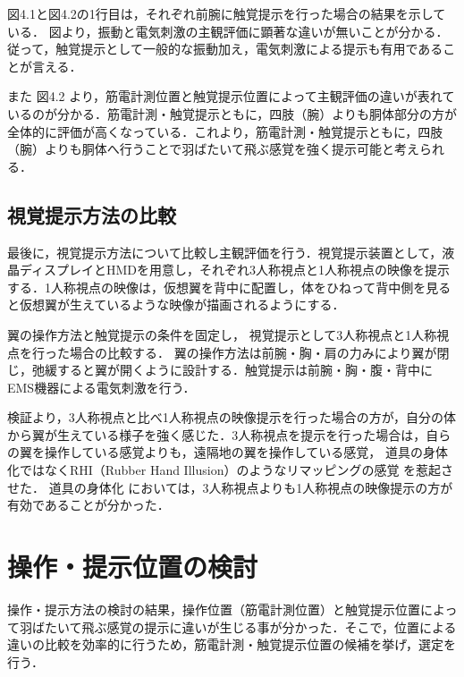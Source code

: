         図4.1と図4.2の1行目は，それぞれ前腕に触覚提示を行った場合の結果を示している．
        図より，振動と電気刺激の主観評価に顕著な違いが無いことが分かる．従って，触覚提示として一般的な振動加え，電気刺激による提示も有用であることが言える．

        また
        図4.2
        より，筋電計測位置と触覚提示位置によって主観評価の違いが表れているのが分かる．筋電計測・触覚提示ともに，四肢（腕）よりも胴体部分の方が全体的に評価が高くなっている．これより，筋電計測・触覚提示ともに，四肢（腕）よりも胴体へ行うことで羽ばたいて飛ぶ感覚を強く提示可能と考えられる．
        

    \subsection{視覚提示方法の比較}
        最後に，視覚提示方法について比較し主観評価を行う．視覚提示装置として，液晶ディスプレイとHMDを用意し，それぞれ3人称視点と1人称視点の映像を提示する．1人称視点の映像は，仮想翼を背中に配置し，体をひねって背中側を見ると仮想翼が生えているような映像が描画されるようにする．

        翼の操作方法と触覚提示の条件を固定し，
        視覚提示として3人称視点と1人称視点を行った場合の比較する．
        翼の操作方法は前腕・胸・肩の力みにより翼が閉じ，弛緩すると翼が開くように設計する．触覚提示は前腕・胸・腹・背中にEMS機器による電気刺激を行う．

        検証より，3人称視点と比べ1人称視点の映像提示を行った場合の方が，自分の体から翼が生えている様子を強く感じた．3人称視点を提示を行った場合は，自らの翼を操作している感覚よりも，遠隔地の翼を操作している感覚，
        道具の身体化ではなくRHI（Rubber Hand Illusion）のようなリマッピングの感覚
        を惹起させた．
        道具の身体化
        においては，3人称視点よりも1人称視点の映像提示の方が有効であることが分かった．
    
\section{操作・提示位置の検討}
    操作・提示方法の検討の結果，操作位置（筋電計測位置）と触覚提示位置によって羽ばたいて飛ぶ感覚の提示に違いが生じる事が分かった．そこで，位置による違いの比較を効率的に行うため，筋電計測・触覚提示位置の候補を挙げ，選定を行う．
    
